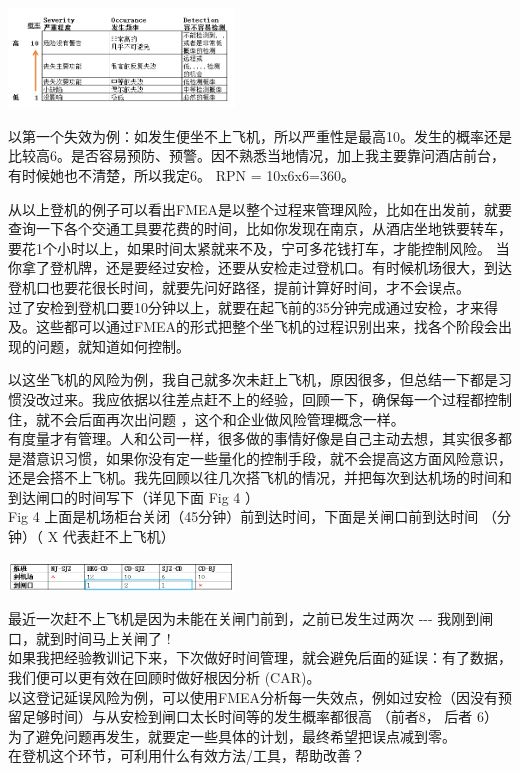 \includegraphics[width=6cm]{风险与机会3_打分参考_1.png}

以第一个失效为例：如发生便坐不上飞机，所以严重性是最高10。发生的概率还是比较高6。是否容易预防、预警。因不熟悉当地情况，加上我主要靠问酒店前台，有时候她也不清楚，所以我定6。
RPN = 10x6x6=360。

从以上登机的例子可以看出FMEA是以整个过程来管理风险，比如在出发前，就要查询一下各个交通工具要花费的时间，比如你发现在南京，从酒店坐地铁要转车，要花1个小时以上，如果时间太紧就来不及，宁可多花钱打车，才能控制风险。
当你拿了登机牌，还是要经过安检，还要从安检走过登机口。有时候机场很大，到达登机口也要花很长时间，就要先问好路径，提前计算好时间，才不会误点。\\
过了安检到登机口要10分钟以上，就要在起飞前的35分钟完成通过安检，才来得及。这些都可以通过FMEA的形式把整个坐飞机的过程识别出来，找各个阶段会出现的问题，就知道如何控制。

以这坐飞机的风险为例，我自己就多次未赶上飞机，原因很多，但总结一下都是习惯没改过来。我应依据以往差点赶不上的经验，回顾一下，确保每一个过程都控制住，就不会后面再次出问题
，这个和企业做风险管理概念一样。\\
有度量才有管理。人和公司一样，很多做的事情好像是自己主动去想，其实很多都是潜意识习惯，如果你没有定一些量化的控制手段，就不会提高这方面风险意识，还是会搭不上飞机。我先回顾以往几次搭飞机的情况，并把每次到达机场的时间和到达闸口的时间写下（详见下面
Fig 4 ）\\
Fig 4 上面是机场柜台关闭（45分钟）前到达时间，下面是关闸口前到达时间
（分钟）（ X 代表赶不上飞机）


\includegraphics[width=6cm]{风险与机会41.png}

最近一次赶不上飞机是因为未能在关闸门前到，之前已发生过两次 -\/-\/-
我刚到闸口，就到时间马上关闸了 !\\
如果我把经验教训记下来，下次做好时间管理，就会避免后面的延误：有了数据，我们便可以更有效在回顾时做好根因分析
(CAR)。\\
以这登记延误风险为例，可以使用FMEA分析每一失效点，例如过安检（因没有预留足够时间）与从安检到闸口太长时间等的发生概率都很高
（前者8， 后者 6）\\
为了避免问题再发生，就要定一些具体的计划，最终希望把误点减到零。\\
在登机这个环节，可利用什么有效方法/工具，帮助改善？

